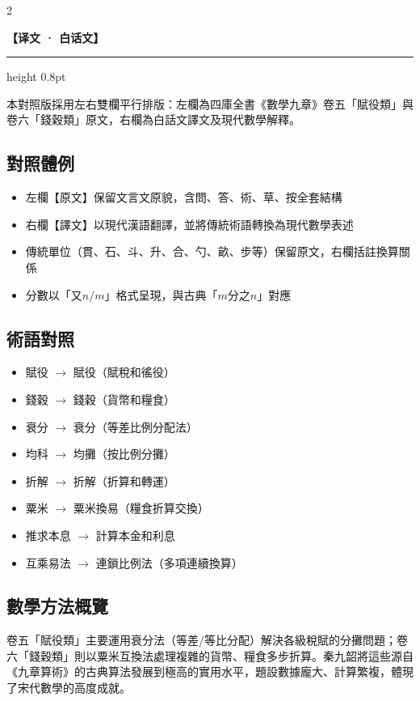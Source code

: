 \documentclass[11pt,a4paper]{article}
\newcommand{\ModernHeader}{%
  \begin{center}\textbf{\color{headermodern}【译文 · 白话文】}\end{center}
  \vspace{-0.5em}
  \hrule height 0.8pt
  \vspace{0.5em}
}
\begin{document}
\begin{paracol}{2}
\switchcolumn

\ModernHeader

本對照版採用左右雙欄平行排版：左欄為四庫全書《數學九章》卷五「賦役類」與卷六「錢穀類」原文，右欄為白話文譯文及現代數學解釋。

\subsection*{對照體例}

\begin{itemize}[leftmargin=1.5em,topsep=2pt]
\item 左欄【原文】保留文言文原貌，含問、答、術、草、按全套結構
\item 右欄【譯文】以現代漢語翻譯，並將傳統術語轉換為現代數學表述
\item 傳統單位（貫、石、斗、升、合、勺、畝、步等）保留原文，右欄括註換算關係
\item 分數以「又$n/m$」格式呈現，與古典「$m$分之$n$」對應
\end{itemize}

\subsection*{術語對照}

\begin{itemize}[leftmargin=1.5em,topsep=2pt]
\item 賦役 $\to$ 賦役（賦稅和徭役）
\item 錢穀 $\to$ 錢穀（貨幣和糧食）
\item 衰分 $\to$ 衰分（等差比例分配法）
\item 均科 $\to$ 均攤（按比例分攤）
\item 折解 $\to$ 折解（折算和轉運）
\item 粟米 $\to$ 粟米換易（糧食折算交換）
\item 推求本息 $\to$ 計算本金和利息
\item 互乘易法 $\to$ 連鎖比例法（多項連續換算）
\end{itemize}

\subsection*{數學方法概覽}

卷五「賦役類」主要運用衰分法（等差/等比分配）解決各級稅賦的分攤問題；卷六「錢穀類」則以粟米互換法處理複雜的貨幣、糧食多步折算。秦九韶將這些源自《九章算術》的古典算法發展到極高的實用水平，題設數據龐大、計算繁複，體現了宋代數學的高度成就。

\end{paracol}
\end{document}

